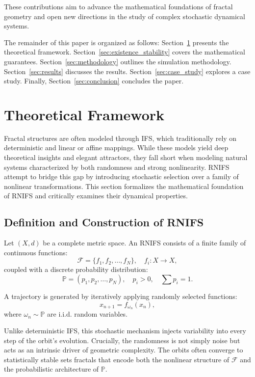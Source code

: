 \documentclass[twocolumn,10pt]{article}
\begin{document}
These contributions aim to advance the mathematical foundations of fractal geometry and open new directions in the study of complex stochastic dynamical systems.

The remainder of this paper is organized as follows: Section~\ref{sec:theory} presents the theoretical framework. Section~\ref{sec:existence_stability} covers the mathematical guarantees. Section~\ref{sec:methodology} outlines the simulation methodology. Section~\ref{sec:results} discusses the results. Section~\ref{sec:case_study} explores a case study. Finally, Section~\ref{sec:conclusion} concludes the paper.



\section{Theoretical Framework}
\label{sec:theory}
\vspace{0.8em}

Fractal structures are often modeled through IFS, which traditionally rely on deterministic and linear or affine mappings. While these models yield deep theoretical insights and elegant attractors, they fall short when modeling natural systems characterized by both randomness and strong nonlinearity. RNIFS attempt to bridge this gap by introducing stochastic selection over a family of nonlinear transformations. This section formalizes the mathematical foundation of RNIFS and critically examines their dynamical properties.

\subsection{Definition and Construction of RNIFS}
\label{subsec:rnifs_definition}

Let $(X, d)$ be a complete metric space. An RNIFS consists of a finite family of continuous functions:
\[
\mathcal{F} = \{ f_1, f_2, \dots, f_N \}, \quad f_i: X \to X,
\]
coupled with a discrete probability distribution:
\[
\mathbb{P} = (p_1, p_2, \dots, p_N), \quad p_i > 0,\quad \sum p_i = 1.
\]

A trajectory is generated by iteratively applying randomly selected functions:
\begin{equation}
x_{n+1} = f_{\omega_n}(x_n),
\label{eq:rnifs_sequence}
\end{equation}
where $\omega_n \sim \mathbb{P}$ are i.i.d. random variables.

Unlike deterministic IFS, this stochastic mechanism injects variability into every step of the orbit's evolution. Crucially, the randomness is not simply noise but acts as an intrinsic driver of geometric complexity. The orbits often converge to statistically stable sets fractals that encode both the nonlinear structure of $\mathcal{F}$ and the probabilistic architecture of $\mathbb{P}$.
\end{document}

